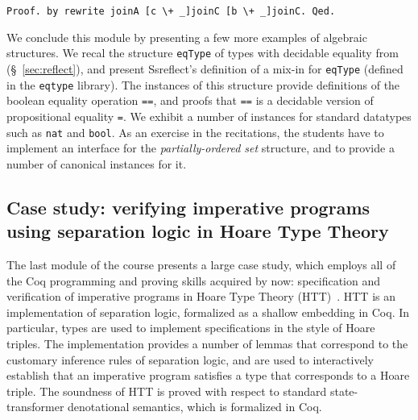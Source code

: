 \documentclass[blockstyle,preprint,nocopyrightspace]{sigplanconf}
\newcommand{\is}[1]{\textcolor{blue}{(Ilya: {#1})}}
\newcommand{\an}[1]{\textcolor{red}{(Aleks: {#1})}}
\newcommand{\code}[1]{\lstinline{#1}}
\begin{document}
%
\begin{lstlisting}
Proof. by rewrite joinA [c \+ _]joinC [b \+ _]joinC. Qed.
\end{lstlisting}
%
%
%
%
We conclude this module by presenting a few more examples of algebraic
structures. We recal the structure \code{eqType} of types with
decidable equality from (\S~\ref{sec:reflect}), and present
Ssreflect's definition of a mix-in for \code{eqType} (defined in the
\code{eqtype} library). The instances of this structure provide
definitions of the boolean equality operation \code{==}, and proofs
that \code{==} is a decidable version of propositional equality
\code{=}. We exhibit a number of instances for standard datatypes such
as \code{nat} and \code{bool}. As an exercise in the recitations, the
students have to implement an interface for the
\emph{partially-ordered set} structure, and to provide a number of
canonical instances for it.


\subsection{Case study: verifying imperative programs using separation
  logic in Hoare Type Theory}

The last module of the course presents a large case study, which
employs all of the Coq programming and proving skills acquired by now:
specification and verification of imperative programs in Hoare Type
Theory (HTT)~\cite{Nanevski-al:JFP08,Nanevski-al:POPL10}.
%
HTT is an implementation of separation logic, formalized as a shallow
embedding in Coq. In particular, types are used to implement
specifications in the style of Hoare triples. The implementation
provides a number of lemmas that correspond to the customary inference
rules of separation logic, and are used to interactively establish
that an imperative program satisfies a type that corresponds to a
Hoare triple. The soundness of HTT is proved with respect to standard
state-transformer denotational semantics, which is formalized in Coq.
\end{document}
